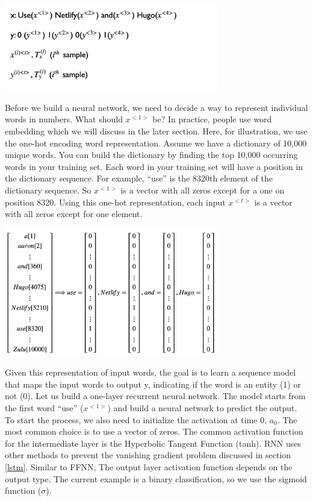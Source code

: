 \documentclass[
  12pt,
]{krantz}
\begin{document}
\includegraphics[width=0.7\textwidth,height=\textheight]{images/rnn_notation.png}

Before we build a neural network, we need to decide a way to represent individual words in numbers. What should \(x^{<1>}\) be? In practice, people use word embedding which we will discuss in the later section. Here, for illustration, we use the one-hot encoding word representation. Assume we have a dictionary of 10,000 unique words. You can build the dictionary by finding the top 10,000 occurring words in your training set. Each word in your training set will have a position in the dictionary sequence. For example, ``use'' is the 8320th element of the dictionary sequence. So \(x^{<1>}\) is a vector with all zeros except for a one on position 8320. Using this one-hot representation, each input \(x^{<t>}\) is a vector with all zeros except for one element.

\includegraphics[width=0.7\textwidth,height=\textheight]{images/nn_ohe.png}

Given this representation of input words, the goal is to learn a sequence model that maps the input words to output y, indicating if the word is an entity (1) or not (0). Let us build a one-layer recurrent neural network. The model starts from the first word ``use'' (\(x^{<1>}\)) and build a neural network to predict the output. To start the process, we also need to initialize the activation at time 0, \(a_0\). The most common choice is to use a vector of zeros. The common activation function for the intermediate layer is the Hyperbolic Tangent Function (tanh). RNN uses other methods to prevent the vanishing gradient problem discussed in section \ref{lstm}. Similar to FFNN, The output layer activation function depends on the output type. The current example is a binary classification, so we use the sigmoid function (\(\sigma\)).
\end{document}
